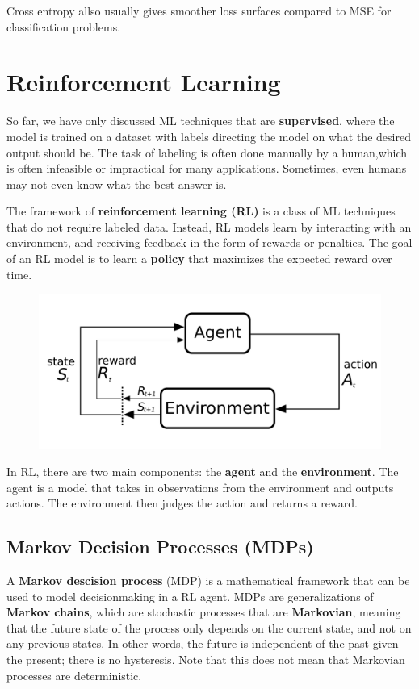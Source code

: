 \documentclass[12pt]{report}
\theoremstyle{definition}
\theoremstyle{remark}
\begin{document}
Cross entropy allso usually gives smoother loss surfaces compared to MSE for classification problems.

\chapter{Reinforcement Learning}
So far, we have only discussed ML techniques that are \textbf{supervised}, where the model is trained on a dataset with labels directing the model on what the desired output should be. The task of labeling is often done manually by a human,which is often infeasible or impractical for many applications. Sometimes, even humans may not even know what the best answer is.

The framework of \textbf{reinforcement learning (RL)} is a class of ML techniques that do not require labeled data. Instead, RL models learn by interacting with an environment, and receiving feedback in the form of rewards or penalties. The goal of an RL model is to learn a \textbf{policy} that maximizes the expected reward over time.

\begin{figure}[h]
    \centering
    \includegraphics[width=0.5\linewidth]{figs/RL_schematic.png}
    \caption{}
    \label{fig:enter-label}
\end{figure}

In RL, there are two main components: the \textbf{agent} and the \textbf{environment}. The agent is a model that takes in observations from the environment and outputs actions.  The environment then judges the action and returns a reward.

\section{Markov Decision Processes (MDPs)}

A \textbf{Markov descision process} (MDP) is a mathematical framework that can be used to model decisionmaking in a RL agent. MDPs are generalizations of \textbf{Markov chains}, which are stochastic processes that are \textbf{Markovian}, meaning that the future state of the process only depends on the current state, and not on any previous states. In other words, the future is independent of the past given the present; there is no hysteresis. Note that this does not mean that Markovian processes are deterministic.
\end{document}

